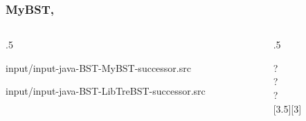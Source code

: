 \documentclass[10pt]{beamer}
\begin{document}
\begin{frame}[t]\frametitle{MyBST, }
	\vspace{-0.3cm}
	\begin{columns}[T] %
	\begin{column}{.5\linewidth} %
		{\tiny 
			
				{input/input-java-BST-MyBST-successor.src}
		} %
		\vspace{-0.3cm}
		{\tiny 
			
				{input/input-java-BST-LibTreBST-successor.src}
		} %
	\end{column} %
	\begin{column}{.5\linewidth} %
		{\tiny 
		\begin{example}
		\begin{center}
			
		\end{center}
		{\scriptsize 		
			 ?\\
			 ?\\				
			 ?\\				
		} %
		\end{example}
		} %
	\end{column} %
	\end{columns} %

\end{frame}
\end{document}
